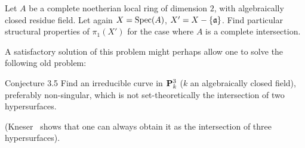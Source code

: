 \begin{problem} \label{XIII.3.4}
Let $A$ be a complete noetherian local ring of dimension $2$, with algebraically closed residue field. Let again $X=\operatorname{Spec}(A)$, $X'=X-\{\mathfrak{a}\}$. Find particular structural properties of $\pi_1(X')$ for the case where $A$ is a complete intersection.
\end{problem}

A satisfactory solution of this problem might perhaps allow one to solve the following old problem:

\label{XIII.3.5}
\begin{enonce*}{Conjecture 3.5\ndemark} Find an irreducible curve in ${\mathbf P}^3_k$ ($k$ an algebraically closed field), preferably non-singular, which is not set-theoretically the intersection of two hypersurfaces.
\end{enonce*}
\noindent(Kneser~\cite{XIII.4} shows that one can always obtain it as the intersection of three hypersurfaces).
